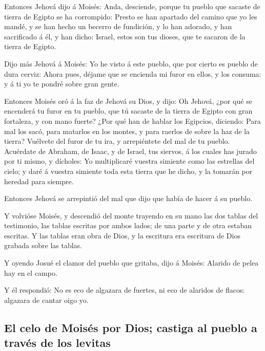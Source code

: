  Entonces Jehová dijo á Moisés: Anda, desciende, porque tu
pueblo que sacaste de tierra de Egipto se ha corrompido: 
Presto se han apartado del camino que yo les mandé, y se han hecho un
becerro de fundición, y lo han adorado, y han sacrificado á él, y han
dicho: Israel, estos son tus dioses, que te sacaron de la tierra de
Egipto.

 Dijo más Jehová á Moisés: Yo he visto á este pueblo, que
por cierto es pueblo de dura cerviz:  Ahora pues, déjame
que se encienda mi furor en ellos, y los consuma: y á ti yo te pondré
sobre gran gente.

 Entonces Moisés oró á la faz de Jehová su Dios, y dijo: Oh
Jehová, ¿por qué se encenderá tu furor en tu pueblo, que tú sacaste de
la tierra de Egipto con gran fortaleza, y con mano fuerte? 
¿Por qué han de hablar los Egipcios, diciendo: Para mal los sacó, para
matarlos en los montes, y para raerlos de sobre la haz de la tierra?
Vuélvete del furor de tu ira, y arrepiéntete del mal de tu pueblo.
 Acuérdate de Abraham, de Isaac, y de Israel, tus siervos,
á los cuales has jurado por ti mismo, y dícholes: Yo multiplicaré
vuestra simiente como las estrellas del cielo; y daré á vuestra simiente
toda esta tierra que he dicho, y la tomarán por heredad para siempre.

 Entonces Jehová se arrepintió del mal que dijo que había
de hacer á su pueblo.

 Y volvióse Moisés, y descendió del monte trayendo en su
mano las dos tablas del testimonio, las tablas escritas por ambos lados;
de una parte y de otra estaban escritas.  Y las tablas eran
obra de Dios, y la escritura era escritura de Dios grabada sobre las
tablas.

 Y oyendo Josué el clamor del pueblo que gritaba, dijo á
Moisés: Alarido de pelea hay en el campo.

 Y él respondió: No es eco de algazara de fuertes, ni eco
de alaridos de flacos: algazara de cantar oigo yo.

\hypertarget{el-celo-de-moisuxe9s-por-dios-castiga-al-pueblo-a-travuxe9s-de-los-levitas}{%
\subsection{El celo de Moisés por Dios; castiga al pueblo a través de
los
levitas}\label{el-celo-de-moisuxe9s-por-dios-castiga-al-pueblo-a-travuxe9s-de-los-levitas}}

